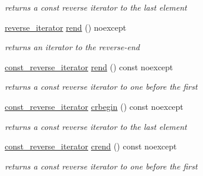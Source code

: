 \begin{DoxyCompactItemize}
\begin{DoxyCompactList}\small\item\em returns a const reverse iterator to the last element \end{DoxyCompactList}\item 
\mbox{\hyperlink{classnlohmann_1_1basic__json_ac223d5560c2b05a208c88de67376c5f2}{reverse\+\_\+iterator}} \mbox{\hyperlink{classnlohmann_1_1basic__json_ac77aed0925d447744676725ab0b6d535}{rend}} () noexcept
\begin{DoxyCompactList}\small\item\em returns an iterator to the reverse-\/end \end{DoxyCompactList}\item 
\mbox{\hyperlink{classnlohmann_1_1basic__json_a72be3c24bfa24f0993d6c11af03e7404}{const\+\_\+reverse\+\_\+iterator}} \mbox{\hyperlink{classnlohmann_1_1basic__json_a4f73d4cee67ea328d785979c22af0ae1}{rend}} () const noexcept
\begin{DoxyCompactList}\small\item\em returns a const reverse iterator to one before the first \end{DoxyCompactList}\item 
\mbox{\hyperlink{classnlohmann_1_1basic__json_a72be3c24bfa24f0993d6c11af03e7404}{const\+\_\+reverse\+\_\+iterator}} \mbox{\hyperlink{classnlohmann_1_1basic__json_a1e0769d22d54573f294da0e5c6abc9de}{crbegin}} () const noexcept
\begin{DoxyCompactList}\small\item\em returns a const reverse iterator to the last element \end{DoxyCompactList}\item 
\mbox{\hyperlink{classnlohmann_1_1basic__json_a72be3c24bfa24f0993d6c11af03e7404}{const\+\_\+reverse\+\_\+iterator}} \mbox{\hyperlink{classnlohmann_1_1basic__json_a5795b029dbf28e0cb2c7a439ec5d0a88}{crend}} () const noexcept
\begin{DoxyCompactList}\small\item\em returns a const reverse iterator to one before the first \end{DoxyCompactList}\end{DoxyCompactItemize}
